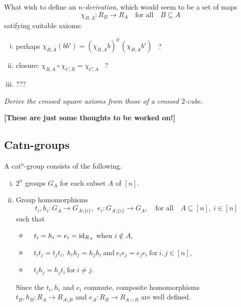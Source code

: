 \bigskip
What wish to define an \emph{$n$-derivation}, 
which would seem to be a set of maps
$$
\chi_{B,A} : R_B \to R_A  \quad\mbox{for all}\quad  B \subseteq A
$$
satifying suitable axioms:
\begin{enumerate}[(i)]
\item
perhaps  \qquad 
$\chi_{B,A}(bb') = (\chi_{B,A} b)^{b'} (\chi_{B,A} b')$ ~?
\item
closure: \qquad
$\chi_{B,A} \circ \chi_{C,B} = \chi_{C,A}$ ~?
\item ???
\end{enumerate}

\begin{exercise}
\emph{Derive the crossed square axioms 
from those of a crossed $2$-cube.}
\end{exercise}


\bigskip\noindent
{\bf [These are just some thoughts to be worked on!]}


\subsection{Catn-groups}   

A cat$^n$-group consists of the following.
\begin{enumerate}[(i)]
\item
$2^n$ groups  $G_A$  for each subset  $A$  of  $[n]$. 

\item
Group homomorphisms
$$
t_i, h_i : G_A \to G_{A \setminus \{i\}}, ~~
e_i : G_{A \setminus \{i\}} \to G_A,
\quad\mbox{for all} \quad 
A \subseteq [n],~ i \in [n]
$$
such that
\begin{itemize}
\item~  
$t_i = h_i = e_i = \mathrm{id}_{R_A}$  when  $i \notin A$,
\item~ 
$t_i t_j = t_j t_i,~
 h_i h_j = h_j h_i ~\mbox{and}~
 e_i e_j = e_j e_i ~\mbox{for}~ i,j \in [n]$,
\item~
$t_i h_j = h_j t_i ~\mbox{for}~ i \neq j$.
\end{itemize}

\noindent
Since the $t_i, h_i$ and $e_i$ commute, composite homomorphisms
$t_B, h_B : R_A \to R_{A \setminus B}$ and 
$e_A : R_B \to R_{A \cup B}$ 
are well defined.
\end{enumerate}



